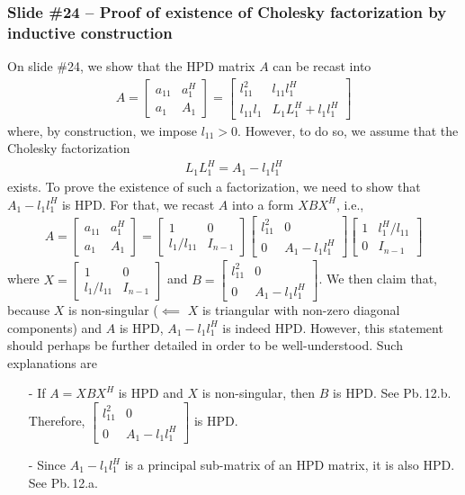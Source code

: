 \documentclass[letterpaper,10pt]{article}
\begin{document}
\subsubsection*{Slide \#24 -- Proof of existence of Cholesky factorization by inductive construction}
On slide \#24, we show that the HPD matrix $A$ can be recast into 
\begin{align*}
A=
\begin{bmatrix}
a_{11}&a_1^H\\
a_1&A_1
\end{bmatrix}
=
\begin{bmatrix}
l_{11}^2&l_{11}l_1^H\\
l_{11}l_1&L_1L_1^H+l_1l_1^H
\end{bmatrix}
\end{align*}
where, by construction, we impose $l_{11}>0$.
However, to do so, we assume that the Cholesky factorization 
\begin{align*}
L_1L_1^H=A_1-l_1l_1^H
\end{align*}
exists.
To prove the existence of such a factorization, we need to show that $A_1-l_1l_1^H$ is HPD.
For that, we recast $A$ into a form $XBX^H$, i.e.,
\begin{align*}
A=
\begin{bmatrix}
a_{11}&a_1^H\\
a_1&A_1
\end{bmatrix}
=
\begin{bmatrix}
1&0\\
l_1/l_{11}&I_{n-1}
\end{bmatrix}
\begin{bmatrix}
l_{11}^2&0\\
0&A_1-l_1l_1^H
\end{bmatrix}
\begin{bmatrix}
1&l_1^H/ l_{11}\\
0&I_{n-1}
\end{bmatrix}
\end{align*}
where $\displaystyle X=\begin{bmatrix}1&0\\l_1/l_{11}&I_{n-1}\end{bmatrix}$ and $\displaystyle B=\begin{bmatrix}
l_{11}^2&0\\
0&A_1-l_1l_1^H
\end{bmatrix}$.
We then claim that, because $X$ is non-singular ($\impliedby$ $X$ is triangular with non-zero diagonal components) and $A$ is HPD, $A_1-l_1l_1^H$ is indeed HPD.
However, this statement should perhaps be further detailed in order to be well-understood. 
Such explanations are
\begin{itemize}
\item[-] If $A=XBX^H$ is HPD and $X$ is non-singular, then $B$ is HPD. See Pb.$\,$12.b.
Therefore, $\displaystyle \begin{bmatrix}
l_{11}^2&0\\
0&A_1-l_1l_1^H
\end{bmatrix}$ is HPD.
\item[-] Since $A_1-l_1l_1^H$ is a principal sub-matrix of an HPD matrix, it is also HPD. See Pb.$\,$12.a.
\end{itemize}
\end{document}
